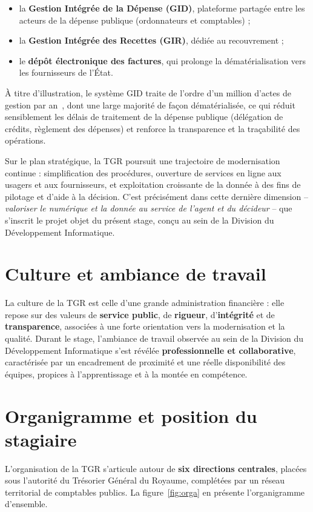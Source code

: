 \documentclass[a4paper,12pt,oneside]{report}
\begin{document}
\begin{itemize}
  \item la \textbf{Gestion Intégrée de la Dépense (GID)}, plateforme partagée
  entre les acteurs de la dépense publique (ordonnateurs et comptables) ;
  \item la \textbf{Gestion Intégrée des Recettes (GIR)}, dédiée au recouvrement ;
  \item le \textbf{dépôt électronique des factures}, qui prolonge la
  dématérialisation vers les fournisseurs de l'État.
\end{itemize}

À titre d'illustration, le système GID traite de l'ordre d'un million d'actes de
gestion par an~\cite{tgr}, dont une large majorité de façon dématérialisée, ce qui réduit
sensiblement les délais de traitement de la dépense publique (délégation de
crédits, règlement des dépenses) et renforce la transparence et la traçabilité
des opérations.

Sur le plan stratégique, la TGR poursuit une trajectoire de modernisation
continue : simplification des procédures, ouverture de services en ligne aux
usagers et aux fournisseurs, et exploitation croissante de la donnée à des fins
de pilotage et d'aide à la décision. C'est précisément dans cette dernière
dimension -- \emph{valoriser le numérique et la donnée au service de l'agent et
du décideur} -- que s'inscrit le projet objet du présent stage, conçu au sein de
la Division du Développement Informatique.

\section{Culture et ambiance de travail}
La culture de la TGR est celle d'une grande administration financière : elle
repose sur des valeurs de \textbf{service public}, de \textbf{rigueur}, d'\textbf{intégrité}
et de \textbf{transparence}, associées à une forte orientation vers la
modernisation et la qualité. Durant le stage, l'ambiance de travail observée au
sein de la Division du Développement Informatique s'est révélée
\textbf{professionnelle et collaborative}, caractérisée par un encadrement de
proximité et une réelle disponibilité des équipes, propices à l'apprentissage et
à la montée en compétence.

\section{Organigramme et position du stagiaire}
L'organisation de la TGR s'articule autour de \textbf{six directions centrales},
placées sous l'autorité du Trésorier Général du Royaume, complétées par un réseau
territorial de comptables publics. La figure~\ref{fig:orga} en présente
l'organigramme d'ensemble.
\end{document}
